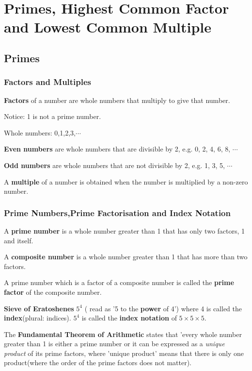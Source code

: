 \documentclass[../main]{subfiles}
\begin{document}
\section{Primes, Highest Common Factor and Lowest Common Multiple}

\subsection{Primes}

\subsubsection{Factors and Multiples}
\textbf{Factors} of a number are whole numbers that multiply to give that number.

Notice: 1 is not a prime number.

Whole numbers: 0,1,2,3,$\cdots$

\textbf{Even numbers} are whole numbers that are divisible by 2, e.g. 0, 2, 4,
6, 8, $\cdots$

\textbf{Odd numbers} are whole numbers that are not divisible by 2, e.g. 1, 3,
5, $\cdots$


A \textbf{multiple} of a number is obtained when the number is multiplied by a
non-zero number.

\subsubsection{Prime Numbers,Prime Factorisation and Index Notation}    

A \textbf{prime number} is a whole number greater than 1 that has only two
factors, 1 and itself.


A \textbf{composite number} is a whole number greater than 1 that has more
than two factors.

A prime number which is a factor of a composite number is called the
\textbf{prime factor} of the composite number.

\textbf{Sieve of Eratoshenes}
\(5^4\) ( read as '5 to the \textbf{power} of 4') where 4 is called the
\textbf{index}(plural: indices). \(5^4\) is called the \textbf{index notation}
of \(5\times 5 \times 5\).

The \textbf{Fundamental Theorem of Arithmetic} states that 'every whole number
greater than 1 is either a prime number or it can be expressed as a
\textit{unique product} of its prime factors, where 'unique product' means that
there is only one product(where the order of the prime factors does not matter).
\end{document}
